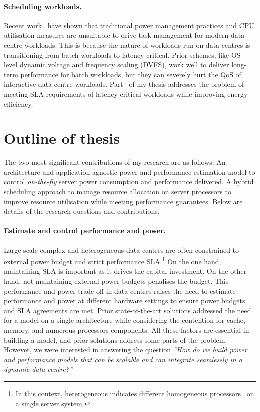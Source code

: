 
 \paragraph{Scheduling workloads.} Recent
work~\citep{Zhuravlev:2013:SES:2498743.2498946, Zhuravlev:2012:SST:2379776.2379780,
Mars:2011:BIU:2155620.2155650, Mars:2011:DCC:1944862.1944887, Yang2013Bubble-flux} have
shown that traditional power management practices and CPU utilisation measures are
unsuitable to drive task management for modern data centre workloads. This is because the
nature of workloads run on data centres is transitioning from batch workloads to
latency-critical.  Prior schemes, like OS-level dynamic voltage and frequency scaling
(DVFS), work well to deliver long-term performance for batch workloads, but they can
severely hurt the QoS of interactive data centre workloads.  Part~ of my thesis
addresses the problem of meeting SLA requirements of latency-critical workloads while
improving energy efficiency.

\section{Outline of thesis} 

\label{section: outline-of-thesis}

 The two most significant contributions of my research are as follows.
{\small{}} An architecture and application agnostic power and performance
estimation model to control \emph{on-the-fly} server power consumption and performance
delivered.  {\small{}} A hybrid scheduling approach to manage resource allocation
on \het server processors to improve resource utilisation while meeting performance
guarantees.  Below are details of the research questions and contributions.

\paragraph{Estimate and control performance and power.} Large scale complex and
heterogeneous data centres are often constrained to external power budget and strict
performance SLA.\footnote{In this context, heterogeneous indicates different homogeneous
processors~\citep{Mars2013Whare-map} on a single server system.} On the one hand,
maintaining SLA is important as it drives the capital investment. On the other hand, not
maintaining external power budgets penalises the budget. This performance and power
trade-off in data centres raises the need to estimate performance and power at different
hardware settings to ensure power budgets and SLA agreements are met.  Prior
state-of-the-art solutions addressed the need for a model on a single architecture while
considering the contention for cache, memory, and numerous processors components.  All
these factors are essential in building a model, and prior solutions address some parts of
the problem.  However, we were interested in answering the question \emph{``How do we
build power and performance models that can be scalable and can integrate seamlessly in a
dynamic data centre?''}

